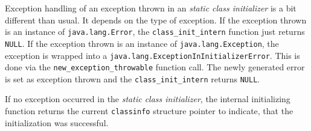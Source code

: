 Exception handling of an exception thrown in an \textit{static class
initializer} is a bit different than usual. It depends on the type of
exception. If the exception thrown is an instance of
\texttt{java.lang.Error}, the \texttt{class\_init\_intern} function
just returns \texttt{NULL}. If the exception thrown is an instance of
\texttt{java.lang.Exception}, the exception is wrapped into a
\texttt{java.lang.ExceptionInInitializerError}. This is done via the
\texttt{new\_exception\_throwable} function call. The newly generated
error is set as exception thrown and the \texttt{class\_init\_intern}
returns \texttt{NULL}.

If no exception occurred in the \textit{static class initializer}, the
internal initializing function returns the current \texttt{classinfo}
structure pointer to indicate, that the initialization was successful.
